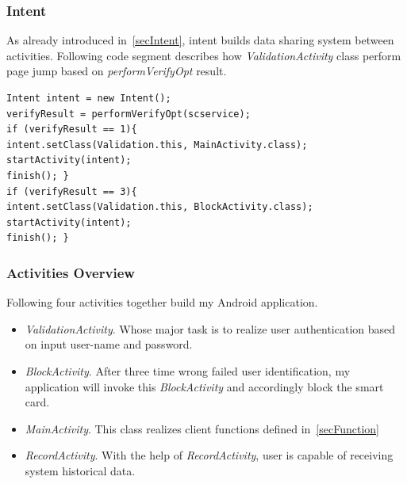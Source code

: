 \subsubsection{Intent}
As already introduced in~\ref{secIntent}, intent builds data sharing system between activities. Following code segment describes how \emph{ValidationActivity} class perform page jump based on \emph{performVerifyOpt} result.
\begin{Verbatim}[fontsize=\relsize{-1},frame=lines,framesep=4mm, label=\fbox{\small\emph{Intent}}]
Intent intent = new Intent();           			  	
verifyResult = performVerifyOpt(scservice);
if (verifyResult == 1){
intent.setClass(Validation.this, MainActivity.class);  
startActivity(intent);  
finish(); }
if (verifyResult == 3){
intent.setClass(Validation.this, BlockActivity.class);  
startActivity(intent);  
finish(); }
\end{Verbatim}
\subsubsection{Activities Overview}
Following four activities together build my Android application.
\begin{itemize}
\item \emph{ValidationActivity}. Whose major task is to realize user authentication based on input user-name and password.
\item \emph{BlockActivity}. After three time wrong failed user identification, my application will invoke this \emph{BlockActivity} and accordingly block the smart card.
\item \emph{MainActivity}. This class realizes client functions defined in~\ref{secFunction}
\item \emph{RecordActivity}. With the help of \emph{RecordActivity}, user is capable of receiving system historical data.
\end{itemize}
